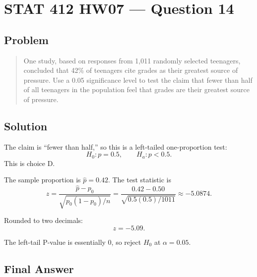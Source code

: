 \documentclass[11pt]{article}
\begin{document}
\section*{STAT 412 HW07 --- Question 14}

\subsection*{Problem}

\begin{quote}
One study, based on responses from 1,011 randomly selected teenagers, concluded that 42\% of teenagers cite grades as their greatest source of pressure. Use a 0.05 significance level to test the claim that fewer than half of all teenagers in the population feel that grades are their greatest source of pressure.
\end{quote}

\subsection*{Solution}

The claim is ``fewer than half,'' so this is a left-tailed one-proportion test:
\[
H_0:p=0.5,\qquad H_a:p<0.5.
\]
This is choice D.

The sample proportion is $\hat{p}=0.42$. The test statistic is
\[
z=\frac{\hat{p}-p_0}{\sqrt{p_0(1-p_0)/n}}
  =\frac{0.42-0.50}{\sqrt{0.5(0.5)/1011}}
  \approx -5.0874.
\]

Rounded to two decimals:
\[
z=-5.09.
\]

The left-tail P-value is essentially 0, so reject $H_0$ at $\alpha=0.05$.

\subsection*{Final Answer}

\end{document}
